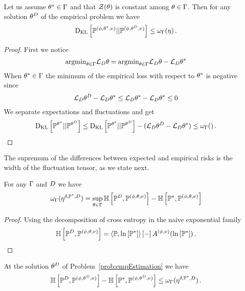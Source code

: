 \begin{theorem}
	Let us assume $\theta^*\in\Gamma$ and that $\mathcal{Z}{\left(\theta\right)}$ is constant among $\theta\in\Gamma$.
	Then for any solution $\theta^{D}$ of the empirical problem we have
	\begin{align}
		\mathrm{D}_{\mathrm{KL}}\left[ \mathbb{P}^{(\phi,\theta^*,\nu)} || \mathbb{P}^{(\phi,\theta^{D},\nu)} \right] \leq \omega_{\Gamma}(\eta) \, .
	\end{align}
\end{theorem}
\begin{proof}
	First we notice
	\begin{align}
		\mathrm{argmin}_{\theta\in\Gamma} \mathcal{L}_{D}\theta = \mathrm{argmin}_{\theta\in\Gamma} \mathcal{L}_{D}\theta - \mathcal{L}_{D}\theta^* 
	\end{align}
	When $\theta^*\in\Gamma$ the minimum of the empirical loss with respect to $\theta^*$ is negative since
	\begin{align}
		\mathcal{L}_{D}\theta^{D} - \mathcal{L}_{D}\theta^* \leq \mathcal{L}_{D}\theta^*-\mathcal{L}_{D}\theta^* \leq 0
	\end{align}
	We separate expectations and fluctuations and get
	\begin{align}
		\mathrm{D}_{\mathrm{KL}}\left[ \mathbb{P}^{\theta^*} || \mathbb{P}^{\theta^{D}} \right] \leq \mathrm{D}_{\mathrm{KL}}\left[ \mathbb{P}^{\theta^*} || \mathbb{P}^{\theta^{D}} \right] - (\mathcal{L}_{D}\theta^{D} - \mathcal{L}_{D}\theta^*) \leq \omega_{\Gamma}() \, .
	\end{align}
\end{proof}

The supremum of the differences between expected and empirical risks is the width of the fluctuation tensor, as we state next.

\begin{lemma}
	For any $\Gamma$ and $D$ we have
	\begin{align*}
		\omega_{\Gamma}(\eta^{\delta,\mathbb{P}^*,D}) 
		= \sup_{\theta\in\Gamma} \mathbb{H}\left[\mathbb{P}^{D},\mathbb{P}^{(\phi,\theta,\nu)}\right] - \mathbb{H}\left[\mathbb{P}^*,\mathbb{P}^{(\phi,\theta,\nu)}\right] 
	\end{align*}
\end{lemma}
\begin{proof}
	Using the decomposition of cross entropy in the naive exponential family 
	 	\[ \mathbb{H}\left[\mathbb{P}^{D},\mathbb{P}^{(\phi,\theta,\nu)}\right]=\left\langle \mathbb{P},\ln \left[ \mathbb{P}^* \right]\right\rangle \left[ - \right] A^{(\phi,\nu)}(\ln \left[ \mathbb{P}^* \right]) \, . \]
\end{proof}


\begin{corollary}
	At the solution $\theta^{D}$ of Problem~\ref{prob:empEstimation} we have
		\[ \mathbb{H}\left[\mathbb{P}^{D},\mathbb{P}^{(\phi,\theta^{D},\nu)}\right] - \mathbb{H}\left[\mathbb{P}^*,\mathbb{P}^{(\phi,\theta^{D},\nu)}\right] 
		\leq  \omega_{\Gamma}(\eta^{\delta,\mathbb{P}^*,D}) \, . \] 
\end{corollary}






